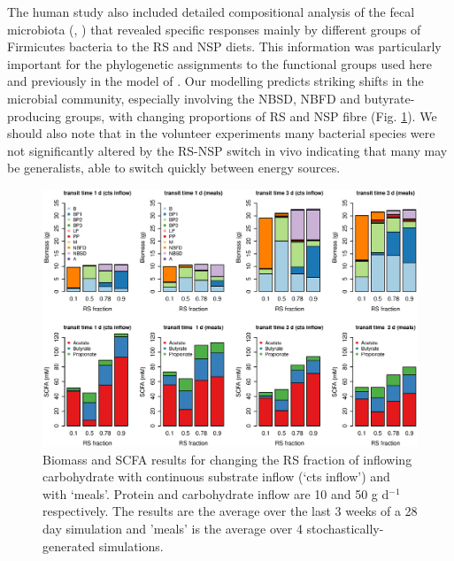 \documentclass[a4paper]{article}
\begin{document}
The human study also included detailed compositional analysis of the fecal microbiota (\cite{walker2011}, \cite{salonen}) that revealed specific responses mainly by different groups of Firmicutes bacteria to the RS and NSP diets. This information was particularly important for the phylogenetic assignments to the functional groups used here and previously in the model of \cite{Kettle2015}. Our modelling predicts striking shifts in the microbial community, especially involving the NBSD, NBFD and butyrate-producing groups, with changing proportions of RS and NSP fibre (Fig. \ref{fig:modelledRSfrac}). 
We should also note that in the volunteer experiments many bacterial species were not significantly altered by the RS-NSP switch in vivo \citep{walker2011} indicating that many may be generalists, able to switch quickly between energy sources.





\begin{figure}
    \centering
    \includegraphics[scale=0.5]{images/modelledRSfrac.eps}
    \caption{Biomass and SCFA results for changing the RS fraction of inflowing carbohydrate with continuous substrate inflow (`cts inflow') and with `meals'. Protein and carbohydrate inflow are 10 and 50 g d$^{-1}$ respectively. The results are the average over the last 3 weeks of a 28 day simulation and 'meals' is the average over 4 stochastically-generated simulations. 
    }
    \label{fig:modelledRSfrac}
\end{figure}
\end{document}

